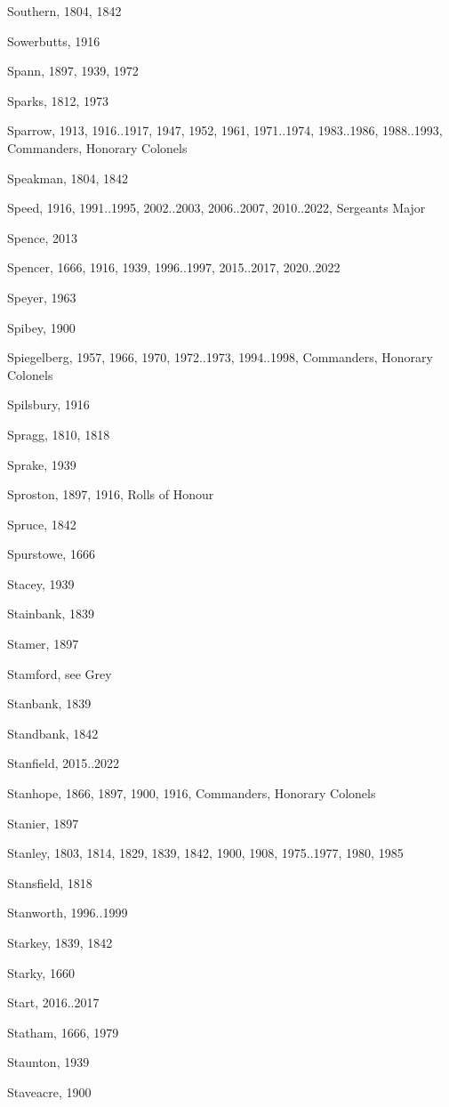 {\begin{theindex}
\item Southern, 1804, 1842
\item Sowerbutts, 1916
\item Spann, 1897, 1939, 1972
\item Sparks, 1812, 1973
\item Sparrow, 1913, 1916..1917, 1947, 1952, 1961, 1971..1974, 1983..1986, 1988..1993, Commanders, Honorary Colonels
\item Speakman, 1804, 1842
\item Speed, 1916, 1991..1995, 2002..2003, 2006..2007, 2010..2022, Sergeants Major
\item Spence, 2013
\item Spencer, 1666, 1916, 1939, 1996..1997, 2015..2017, 2020..2022
\item Speyer, 1963
\item Spibey, 1900
\item Spiegelberg, 1957, 1966, 1970, 1972..1973, 1994..1998, Commanders, Honorary Colonels
\item Spilsbury, 1916
\item Spragg, 1810, 1818
\item Sprake, 1939
\item Sproston, 1897, 1916, Rolls of Honour
\item Spruce, 1842
\item Spurstowe, 1666
\item Stacey, 1939
\item Stainbank, 1839
\item Stamer, 1897
\item Stamford, see Grey
\item Stanbank, 1839
\item Standbank, 1842
\item Stanfield, 2015..2022
\item Stanhope, 1866, 1897, 1900, 1916, Commanders, Honorary Colonels
\item Stanier, 1897
\item Stanley, 1803, 1814, 1829, 1839, 1842, 1900, 1908, 1975..1977, 1980, 1985
\item Stansfield, 1818
\item Stanworth, 1996..1999
\item Starkey, 1839, 1842
\item Starky, 1660
\item Start, 2016..2017
\item Statham, 1666, 1979
\item Staunton, 1939
\item Staveacre, 1900

\end{theindex}}
